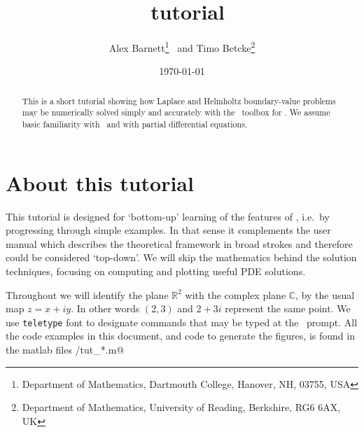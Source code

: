 \documentclass[11pt]{article}
\begin{document}
\title{\mpspack\ tutorial}
\author{Alex Barnett\footnote{Department of Mathematics, Dartmouth College,
Hanover, NH, 03755, USA}
\ and
Timo Betcke\footnote{Department of Mathematics,
University of Reading, Berkshire, RG6 6AX, UK}}
\date{\today}   %

\maketitle
\begin{abstract}
This is a short tutorial showing how Laplace and Helmholtz
boundary-value problems
may be numerically solved simply and accurately with the \mpspack\ toolbox
for \matlab. We assume basic familiarity with \matlab\
and with partial differential equations.
\end{abstract}


\section{About this tutorial}

This tutorial is designed for `bottom-up' learning of the features
of \mpspack, i.e.\ by progressing through simple examples.
In that sense it complements the user manual which describes
the theoretical framework in broad strokes and therefore could
be considered `top-down'.
We will skip the mathematics behind the solution techniques,
focusing on computing and plotting useful PDE solutions.

Throughout we will identify the plane $\mathbb{R}^2$ with the complex
plane $\mathbb{C}$, by the usual map $z=x+iy$. In other words
$(2,3)$ and $2+3i$ represent the same point.
We use {\tt teletype} font to designate commands that may be typed
at the \matlab\ prompt.
All the code examples in this document, and code to generate the
figures, is found in the matlab files \verb@examples/tut_*.m@









 

\end{document}
